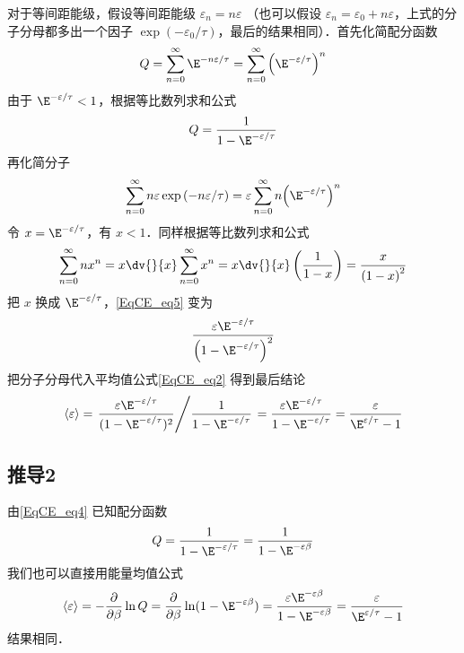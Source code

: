 对于等间距能级，假设等间距能级 ${\varepsilon _n} = n\varepsilon$ （也可以假设 ${\varepsilon _n} = {\varepsilon _0} + n\varepsilon $，上式的分子分母都多出一个因子 $\exp ( - {\varepsilon _0}/\tau )$，最后的结果相同）．首先化简配分函数
\begin{equation}
Q = \sum\limits_{n = 0}^\infty  {{\E^{ - n\varepsilon /\tau }}}  = \sum\limits_{n = 0}^\infty  {{{\left( {{\E^{ - \varepsilon /\tau }}} \right)}^n}} 
\end{equation}
由于 ${\E^{ - \varepsilon /\tau }} < 1$，根据等比数列求和公式 %
\begin{equation}\label{EqCE_eq4}
Q = \frac{1}{{1 - {\E^{ - \varepsilon /\tau }}}}
\end{equation}
再化简分子
\begin{equation}\label{EqCE_eq5}
\sum\limits_{n = 0}^\infty  {n\varepsilon \exp \left( { - n\varepsilon /\tau } \right)}  = \varepsilon \sum\limits_{n = 0}^\infty  {n{{\left( {{\E^{ - \varepsilon /\tau }}} \right)}^n}}
\end{equation}
令 $x = {\E^{ - \varepsilon /\tau }}$，有 $x < 1$．同样根据等比数列求和公式
\begin{equation}
\sum\limits_{n = 0}^\infty  {n{x^n}}  = x\dv{}{x}\sum\limits_{n = 0}^\infty  {{x^n}}  = x\dv{}{x}\left( {\frac{1}{{1 - x}}} \right) = \frac{x}{{{{\left( {1 - x} \right)}^2}}}
\end{equation}
把 $x$ 换成 ${\E^{ - \varepsilon /\tau }}$，\autoref{EqCE_eq5} 变为
\begin{equation}
\frac{{\varepsilon {\E^{ - \varepsilon /\tau }}}}{{{{\left( {1 - {\E^{ - \varepsilon /\tau }}} \right)}^2}}}
\end{equation}
把分子分母代入平均值公式\autoref{EqCE_eq2} 得到最后结论
\begin{equation}
\langle \varepsilon \rangle = \left. \frac{\varepsilon \E^{-\varepsilon/\tau}}{(1 - \E^{-\varepsilon /\tau})^2} \middle/ \frac{1}{1 - \E^{-\varepsilon/\tau}}  \right. = \frac{\varepsilon \E^{-\varepsilon/\tau}}{1 - \E^{-\varepsilon/\tau}} = \frac{\varepsilon}{\E^{\varepsilon/\tau} - 1}
\end{equation}

\subsection{推导2}
由\autoref{EqCE_eq4} 已知配分函数
\begin{equation}
Q = \frac{1}{{1 - {\E^{ - \varepsilon /\tau }}}} = \frac{1}{{1 - {\E^{ - \varepsilon\beta }}}}
\end{equation}
我们也可以直接用能量均值公式
\begin{equation}
\langle\varepsilon\rangle = -\frac{\partial}{\partial\beta}\ln Q
= \frac{\partial }{{\partial \beta }}\ln (1 - {\E^{ - \varepsilon \beta }}) = \frac{{\varepsilon {\E^{ - \varepsilon \beta }}}}{{1 - {\E^{ - \varepsilon \beta }}}} = \frac{\varepsilon }{{{\E^{\varepsilon /\tau }} - 1}}
\end{equation}
结果相同．
